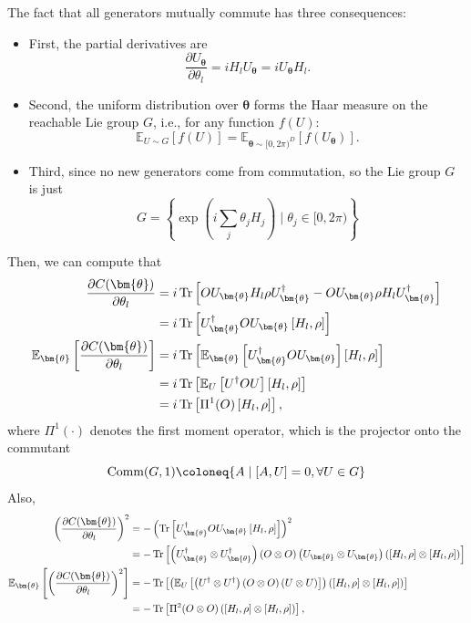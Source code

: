 \documentclass[a4paper,onecolumn,notitlepage,nofootinbib,longbibliography,superscriptaddress, floatfix, pra, aps, 10pt]{revtex4-2}
\newcommand{\vttheta}{{\bm{\theta}}}
\begin{document}
The fact that all generators mutually commute has three consequences: 
\begin{itemize}
    \item First, the partial derivatives are \begin{equation}
    \frac{\partial U_\vttheta}{\partial \theta_l} = iH_l U_\vttheta = i U_\vttheta H_l.
\end{equation}
\item Second, the uniform distribution over $\vttheta$ forms the Haar measure on the reachable Lie group $G$, i.e., for any function $f(U)$:
\begin{equation}
    \mathbb{E}_{U\sim G}\left[f(U)\right] = \mathbb{E}_{\vttheta \sim [0,2\pi)^D}\left[f(U_\vttheta)\right].
\end{equation}
\item Third, since no new generators come from commutation, so the Lie group $G$ is just
\begin{equation}
    G = \left\{\exp\left(i \sum_{j}\theta_jH_j\right) \mid \theta_j \in [0,2\pi)\right\}
\end{equation}
\end{itemize}
Then, we can compute that 
\begin{align}
\frac{\partial C(\vttheta)}{\partial {\theta_l}} & = i\Tr\left[OU_\vttheta H_l \rho U_\vttheta^\dagger - OU_\vttheta\rho H_l U_\vttheta^\dagger \right] \\
&= i\Tr\left[U_\vttheta^\dagger OU_\vttheta \left[H_l,\rho\right]  \right] \\
\mathbb{E}_\vttheta \left[\frac{\partial C(\vttheta)}{\partial {\theta_l}}\right] &= i\Tr\left[\mathbb{E}_\vttheta \left[U_\vttheta^\dagger OU_\vttheta \right] \left[H_l,\rho\right]  \right] \\
& = i\Tr\left[\mathbb{E}_U \left[U ^\dagger OU \right] \left[H_l,\rho\right]  \right] \\
&= i\Tr\left[\Pi^1(O)\left[H_l,\rho\right]  \right],
\end{align}
where $\Pi^1(\cdot)$ denotes the first moment operator, which is the projector onto the commutant \begin{equation}
    \text{Comm}(G,1)\coloneq \{A \mid \comm{A}{U} =0, \forall U \in G\}
\end{equation} Also,
\begin{align}
\left(\frac{\partial C(\vttheta)}{\partial {\theta_l}}\right)^2 &= -\left(\Tr\left[U_\vttheta^\dagger  OU_\vttheta \left[H_l,\rho\right]  \right]\right)^2 \\
&= - \Tr\left[\left(U_\vttheta^\dagger \otimes U_\vttheta^\dagger \right) \left(O \otimes O\right) \left(U_\vttheta \otimes U_\vttheta \right)\left(\left[H_l,\rho\right] \otimes \left[H_l,\rho\right] \right) \right] \\
\mathbb{E}_\vttheta\left[\left(\frac{\partial C(\vttheta)}{\partial {\theta_l}}\right)^2 \right] &= -\Tr\left[\left(\mathbb{E}_U \left[\left(U^\dagger \otimes U^\dagger \right) \left(O \otimes O\right) \left(U \otimes U \right)\right]\right) \left(\left[H_l,\rho\right] \otimes \left[H_l,\rho\right] \right) \right] \\
&= -\Tr\left[\Pi^2(O\otimes O) \left(\left[H_l,\rho\right] \otimes \left[H_l,\rho\right] \right)\right],
\end{align}
\end{document}
